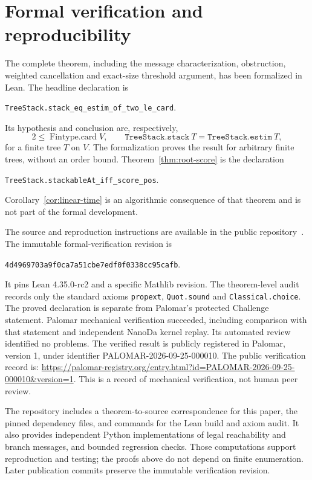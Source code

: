 \documentclass[11pt]{amsart}
\theoremstyle{definition}
\theoremstyle{remark}
\begin{document}
\section{Formal verification and reproducibility}
The complete theorem, including the message characterization, obstruction,
weighted cancellation and exact-size threshold argument, has been formalized
in Lean. The headline declaration is
\begin{center}
\texttt{TreeStack.stack\_eq\_estim\_of\_two\_le\_card}.
\end{center}
Its hypothesis and conclusion are, respectively,
\[
 2\le\operatorname{Fintype.card}V,
 \qquad
 \texttt{TreeStack.stack}\ T=\texttt{TreeStack.estim}\ T,
\]
for a finite tree $T$ on $V$. The formalization proves the result for
arbitrary finite trees, without an order bound.
Theorem~\ref{thm:root-score} is the declaration
\begin{center}
\texttt{TreeStack.stackableAt\_iff\_score\_pos}.
\end{center}
Corollary~\ref{cor:linear-time} is an algorithmic consequence of that theorem
and is not part of the formal development.

The source and reproduction instructions are available in the public
repository~\cite{treestack}. The immutable formal-verification revision is
\begin{center}
\texttt{4d4969703a9f0ca7a51cbe7edf0f0338cc95cafb}.
\end{center}
It pins Lean 4.35.0-rc2 and a specific Mathlib revision. The theorem-level
audit records only the standard axioms \texttt{propext},
\texttt{Quot.sound} and \texttt{Classical.choice}.
The proved declaration is separate from Palomar's protected Challenge
statement. Palomar mechanical verification succeeded, including comparison
with that statement and independent NanoDa kernel replay. Its automated
review identified no problems. The verified result is publicly registered in
Palomar, version 1, under identifier PALOMAR-2026-09-25-000010. The public
verification record is:
\url{https://palomar-registry.org/entry.html?id=PALOMAR-2026-09-25-000010&version=1}.
This is a record of mechanical verification, not human peer review.

The repository includes a theorem-to-source correspondence for this paper,
the pinned dependency files, and commands for the Lean build and axiom audit.
It also provides independent Python implementations of legal reachability
and branch messages, and bounded regression checks. Those computations
support reproduction and testing; the proofs above do not depend on finite
enumeration. Later publication commits preserve the immutable verification
revision.
\end{document}
